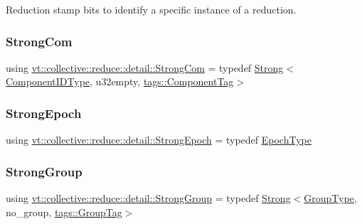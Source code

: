 Reduction stamp bits to identify a specific instance of a reduction. 

\mbox{\label{namespacevt_1_1collective_1_1reduce_1_1detail_a6ea2d8e8f8ba226a6e704a9041aebaec}} 
\subsubsection{\texorpdfstring{Strong\+Com}{StrongCom}}
{\footnotesize\ttfamily using \hyperlink{namespacevt_1_1collective_1_1reduce_1_1detail_a6ea2d8e8f8ba226a6e704a9041aebaec}{vt\+::collective\+::reduce\+::detail\+::\+Strong\+Com} = typedef \hyperlink{namespacevt_adbd3338278905742eb2de6db590fd2f1}{Strong}$<$\hyperlink{namespacevt_ab6ac935c168b809c422d5121da4f2700}{Component\+I\+D\+Type}, u32empty, \hyperlink{structvt_1_1collective_1_1reduce_1_1detail_1_1tags_1_1_component_tag}{tags\+::\+Component\+Tag}$>$}

\mbox{\label{namespacevt_1_1collective_1_1reduce_1_1detail_ad6739d14b8ee41189f785355708748fc}} 
\subsubsection{\texorpdfstring{Strong\+Epoch}{StrongEpoch}}
{\footnotesize\ttfamily using \hyperlink{namespacevt_1_1collective_1_1reduce_1_1detail_ad6739d14b8ee41189f785355708748fc}{vt\+::collective\+::reduce\+::detail\+::\+Strong\+Epoch} = typedef \hyperlink{namespacevt_a81d11b28122d43bf9834577e4a06440f}{Epoch\+Type}}

\mbox{\label{namespacevt_1_1collective_1_1reduce_1_1detail_adcad97800459415ff6ea4b5feb90e0f2}} 
\subsubsection{\texorpdfstring{Strong\+Group}{StrongGroup}}
{\footnotesize\ttfamily using \hyperlink{namespacevt_1_1collective_1_1reduce_1_1detail_adcad97800459415ff6ea4b5feb90e0f2}{vt\+::collective\+::reduce\+::detail\+::\+Strong\+Group} = typedef \hyperlink{namespacevt_adbd3338278905742eb2de6db590fd2f1}{Strong}$<$\hyperlink{namespacevt_a27b5e4411c9b6140c49100e050e2f743}{Group\+Type}, no\+\_\+group, \hyperlink{structvt_1_1collective_1_1reduce_1_1detail_1_1tags_1_1_group_tag}{tags\+::\+Group\+Tag}$>$}

